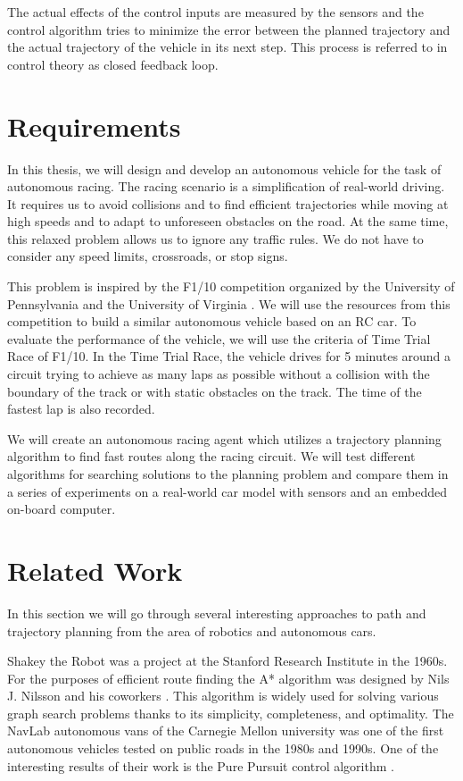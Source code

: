 The actual effects of the control inputs are measured by the sensors and the control algorithm tries to minimize the error between the planned trajectory and the actual trajectory of the vehicle in its next step. This process is referred to in control theory as closed feedback loop.

\section{Requirements}

In this thesis, we will design and develop an autonomous vehicle for the task of autonomous racing. The racing scenario is a simplification of real-world driving. It requires us to avoid collisions and to find efficient trajectories while moving at high speeds and to adapt to unforeseen obstacles on the road. At the same time, this relaxed problem allows us to ignore any traffic rules. We do not have to consider any speed limits, crossroads, or stop signs.

This problem is inspired by the F1/10 competition organized by the University of Pennsylvania and the University of Virginia \cite{F1/10_web}. We will use the resources from this competition to build a similar autonomous vehicle based on an RC car. To evaluate the performance of the vehicle, we will use the criteria of Time Trial Race of F1/10. In the Time Trial Race, the vehicle drives for 5 minutes around a circuit trying to achieve as many laps as possible without a collision with the boundary of the track or with static obstacles on the track. The time of the fastest lap is also recorded.

We will create an autonomous racing agent which utilizes a trajectory planning algorithm to find fast routes along the racing circuit. We will test different algorithms for searching solutions to the planning problem and compare them in a series of experiments on a real-world car model with sensors and an embedded on-board computer.

\section{Related Work}

In this section we will go through several interesting approaches to path and trajectory planning from the area of robotics and autonomous cars.

Shakey the Robot was a project at the Stanford Research Institute in the 1960s. For the purposes of efficient route finding the A* algorithm was designed by Nils J. Nilsson and his coworkers \cite{Nilsson}. This algorithm is widely used for solving various graph search problems thanks to its simplicity, completeness, and optimality. The NavLab autonomous vans of the Carnegie Mellon university was one of the first autonomous vehicles tested on public roads in the 1980s and 1990s. One of the interesting results of their work is the Pure Pursuit control algorithm \cite{Pure_pursuit}.

